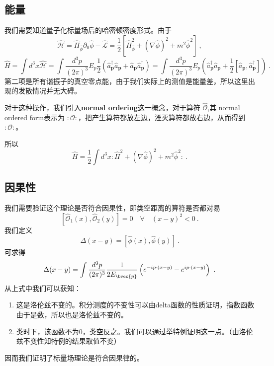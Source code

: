 \subsection{能量}
我们需要知道量子化标量场后的哈密顿密度形式。由于
\begin{equation}
\hat{\mathcal{H}}=\hat{\Pi}_{\hat{\phi}} \partial_{0} \hat{\phi}-\hat{\mathcal{L}}=\frac{1}{2}\left[\hat{\Pi}_{\hat{\phi}}^{2}+(\nabla \hat{\phi})^{2}+m^{2} \hat{\phi}^{2}\right]~,
\end{equation}
\begin{equation}
\hat{H}=\int d^{3} x \hat{\mathcal{H}}=\int \frac{d^{3} p}{(2 \pi)^{3}} E_{p} \frac{1}{2}\left(\hat{a}_{\mathbf{p}}^{\dagger} \hat{a}_{\mathbf{p}}+\hat{a}_{\mathbf{p}} \hat{a}_{\mathbf{p}}^{\dagger}\right)=\int \frac{d^{3} p}{(2 \pi)^{3}} E_{p}\left(\hat{a}_{\mathbf{p}}^{\dagger} \hat{a}_{\mathbf{p}}+\frac{1}{2}\left[\hat{a}_{\mathbf{p}}, \hat{a}_{\mathbf{p}}^{\dagger}\right]\right)~.
\end{equation}
第二项是所有谐振子的真空零点能，由于我们实际上的测值是能量差，所以这里出现的发散情况并无大碍。

对于这种操作，我们引入\textbf{normal ordering}这一概念，对于算符 $\hat{\mathcal{O}}$,其 normal ordered form表示为 $:\mathcal{O}:$，把产生算符都放左边，湮灭算符都放右边，从而得到 $:\mathcal{O}:$。

所以
\begin{equation}
\hat{H}=\frac{1}{2} \int d^{3} x: \hat{\Pi}^{2}+(\nabla \hat{\phi})^{2}+m^{2} \hat{\phi}^{2}:~.
\end{equation}

\subsection{因果性}
我们需要验证这个理论是否符合因果性，即类空距离的算符是否都对易
\begin{equation}
\left[\mathcal{\hat{O}}_{1}(x), \mathcal{\hat{O}}_{2}(y)\right]=0 \quad \forall \quad(x-y)^{2}<0~.
\end{equation}
我们定义
\begin{equation}
\Delta(x-y)=[\hat{\phi}(x), \hat{\phi}(y)]~.
\end{equation}
可求得
\begin{equation}
\Delta(x-y)=\int \frac{d^{3} p}{(2 \pi)^{3}} \frac{1}{2 E_{\bvec{p}}}\left(e^{-i p \cdot(x-y)}-e^{i p \cdot(x-y)}\right)~.
\end{equation}
从上式中我们可以获知：
\begin{enumerate}
\item 这是洛伦兹不变的。积分测度的不变性可以由delta函数的性质证明，指数函数由于是数，所以也是洛伦兹不变的。
\item 类时下，该函数不为0，类空反之。我们可以通过举特例证明这一点。（由洛伦兹不变性知特例的结果取值不变）
\end{enumerate}
因而我们证明了标量场理论是符合因果律的。

